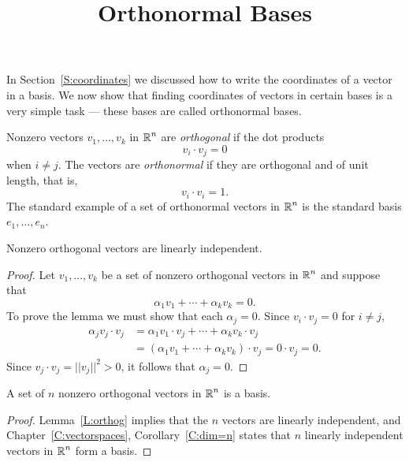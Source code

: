 \documentclass{ximera}
\title{Orthonormal Bases}
\begin{document}
\begin{abstract}
\end{abstract}
\maketitle


\label{S:orthonormal}

In Section~\ref{S:coordinates} we discussed how to write the coordinates of
a vector in a basis.  We now show that finding coordinates of vectors in
certain bases is a very simple task --- these bases are called orthonormal
bases.

Nonzero vectors $v_1,\ldots,v_k$ in $\mbox{$\Bbb{R}$}^n$ are
{\em orthogonal\/} if the
dot products
\[
v_i\cdot v_j  =  0
\]
when $i\neq j$.  The vectors are
{\em orthonormal\/} if they are
orthogonal and of unit length, that is,
\[
v_i\cdot v_i=1.
\]
The standard example of a set of orthonormal vectors in $\mbox{$\Bbb{R}$}^n$ is the
standard basis $e_1,\ldots,e_n$.

\begin{lemma} \label{L:orthog}
Nonzero orthogonal vectors are
linearly independent.
\end{lemma}

\begin{proof}  Let $v_1,\ldots,v_k$ be a set of nonzero orthogonal vectors in $\mbox{$\Bbb{R}$}^n$
and suppose that
\[
\alpha_1v_1 + \cdots + \alpha_kv_k = 0.
\]
To prove the lemma we must show that each $\alpha_j=0$.  Since
$v_i\cdot v_j = 0$ for $i\not= j$,
\begin{align*}
  \alpha_jv_j\cdot v_j &= \alpha_1v_1\cdot v_j + \cdots + \alpha_kv_k\cdot v_j \\
  &= (\alpha_1v_1 + \cdots +\alpha_kv_k)\cdot v_j = 0\cdot v_j = 0.
\end{align*}
Since $v_j\cdot v_j = ||v_j||^2> 0$, it follows that $\alpha_j=0$.  \end{proof}

\begin{corollary}
A set of $n$ nonzero orthogonal vectors in $\mbox{$\Bbb{R}$}^n$ is a basis.
\end{corollary}

\begin{proof}  Lemma~\ref{L:orthog} implies that the $n$ vectors are linearly
independent, and Chapter~\ref{C:vectorspaces}, Corollary~\ref{C:dim=n} states
that $n$ linearly independent vectors in $\mbox{$\Bbb{R}$}^n$ form a basis.  \end{proof}
\end{document}
